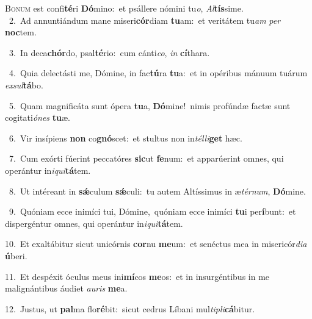 \lettrine{\initial\textcolor{\initialcolor}{B}}{onum} est confi\-\textbf{té}\-ri \textbf{Dó}\-mino:~\star et psállere nómini tu\-\textit{o}\-, \textit{Al}\-\textbf{tís}sime.\\
{\numbfont\textcolor{\numbcolor}{~2.}}~Ad annuntiándum mane miseri\-\textbf{cór}\-diam \textbf{tu}\-am:~\star et veritátem tu\textit{am} \textit{per} \textbf{noc}\-tem.\par
{\numbfont\textcolor{\numbcolor}{~3.}}~In deca\-\textbf{chór}\-do, psal\-\textbf{té}\-rio:~\star cum cánti\-\textit{co}\-, \textit{in} \textbf{cí}\-thara.\par
{\numbfont\textcolor{\numbcolor}{~4.}}~Quia delectásti me, Dómine, in fac\-\textbf{tú}\-ra \textbf{tu}\-a:~\star et in opéribus mánuum tuárum \textit{ex}\-\textit{sul}\textbf{tá}bo.\par
{\numbfont\textcolor{\numbcolor}{~5.}}~Quam magnificáta sunt ópera \textbf{tu}\-a, \textbf{Dó}\-mine!~\star nimis profúndæ factæ sunt cogitati\-\textit{ó}\-\textit{nes} \textbf{tu}\-æ.\par
{\numbfont\textcolor{\numbcolor}{~6.}}~Vir insípiens \textbf{non} co\-\textbf{gnó}\-scet:~\star et stultus non in\-\textit{tél}\-\textit{li}\textbf{get} hæc.\par
{\numbfont\textcolor{\numbcolor}{~7.}}~Cum exórti fúerint peccatóres \textbf{sic}\-ut \textbf{fe}\-num:~\star et apparúerint omnes, qui operántur in\-\textit{i}\-\textit{qui}\textbf{tá}tem.\par
{\numbfont\textcolor{\numbcolor}{~8.}}~Ut intéreant in \textbf{sǽ}\-culum \textbf{sǽ}\-culi:~\star tu autem Altíssimus in æ\-\textit{tér}\-\textit{num}, \textbf{Dó}\-mine.\par
{\numbfont\textcolor{\numbcolor}{~9.}}~Quóniam ecce inimíci tui, Dómine,~\dagger quóniam ecce inimíci \textbf{tu}\-i per\-\textbf{í}\-bunt:~\star et dispergéntur omnes, qui operántur in\-\textit{i}\-\textit{qui}\textbf{tá}tem.\par
{\numbfont\textcolor{\numbcolor}{10.}}~Et exaltábitur sicut unicórnis \textbf{cor}\-nu \textbf{me}\-um:~\star et senéctus mea in misericór\-\textit{di}\-\textit{a} \textbf{ú}\-beri.\par
{\numbfont\textcolor{\numbcolor}{11.}}~Et despéxit óculus meus ini\-\textbf{mí}\-cos \textbf{me}\-os:~\star et in insurgéntibus in me malignántibus áudiet \textit{au}\-\textit{ris} \textbf{me}\-a.\par
{\numbfont\textcolor{\numbcolor}{12.}}~Justus, ut \textbf{pal}\-ma flo\-\textbf{ré}\-bit:~\star sicut cedrus Líbani mul\-\textit{ti}\-\textit{pli}\textbf{cá}bitur.\par
